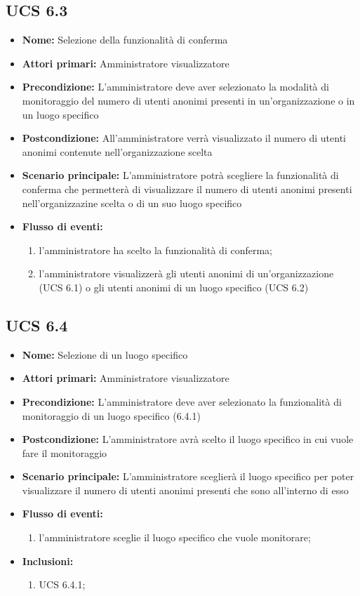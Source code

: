 \subsection{UCS 6.3}%
\begin{itemize}
	\item \textbf{Nome:} Selezione della funzionalità di conferma
	\item \textbf{Attori primari:} Amministratore visualizzatore
	\item \textbf{Precondizione:} L'amministratore deve aver selezionato la modalità di monitoraggio del numero di utenti anonimi presenti in un'organizzazione o in un luogo specifico
	\item \textbf{Postcondizione:} All'amministratore verrà visualizzato il numero di utenti anonimi contenute nell'organizzazione scelta 
	\item \textbf{Scenario principale:} L'amministratore potrà scegliere la funzionalità di conferma che permetterà di visualizzare il numero di utenti anonimi presenti nell'organizzazine scelta o di un suo luogo specifico
	\item \textbf{Flusso di eventi:} 
	\begin{enumerate}
		\item l'amministratore ha scelto la funzionalità di conferma;
		\item l'amministratore visualizzerà gli utenti anonimi di un'organizzazione (UCS 6.1) o gli utenti anonimi di un luogo specifico (UCS 6.2)
	\end{enumerate}
\end{itemize}

\subsection{UCS 6.4}%
\begin{itemize}
	\item \textbf{Nome:} Selezione di un luogo specifico
	\item \textbf{Attori primari:} Amministratore visualizzatore
	\item \textbf{Precondizione:} L'amministratore deve aver selezionato la funzionalità di monitoraggio di un luogo specifico (6.4.1)
	\item \textbf{Postcondizione:} L'amministratore avrà scelto il luogo specifico in cui vuole fare il monitoraggio
	\item \textbf{Scenario principale:} L'amministratore sceglierà il luogo specifico per poter visualizzare il numero di utenti anonimi presenti che sono all'interno di esso
	\item \textbf{Flusso di eventi:} 
	\begin{enumerate}
		\item l'amministratore sceglie il luogo specifico che vuole monitorare;
	\end{enumerate}
	\item \textbf{Inclusioni:}
	\begin{enumerate}
		\item UCS 6.4.1;
	\end{enumerate}
\end{itemize}

